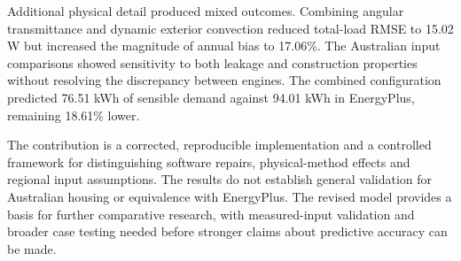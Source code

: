 Additional physical detail produced mixed outcomes. Combining angular transmittance and dynamic exterior convection reduced total-load RMSE to 15.02 W but increased the magnitude of annual bias to 17.06\%. The Australian input comparisons showed sensitivity to both leakage and construction properties without resolving the discrepancy between engines. The combined configuration predicted 76.51 kWh of sensible demand against 94.01 kWh in EnergyPlus, remaining 18.61\% lower.

The contribution is a corrected, reproducible implementation and a controlled framework for distinguishing software repairs, physical-method effects and regional input assumptions. The results do not establish general validation for Australian housing or equivalence with EnergyPlus. The revised model provides a basis for further comparative research, with measured-input validation and broader case testing needed before stronger claims about predictive accuracy can be made.
